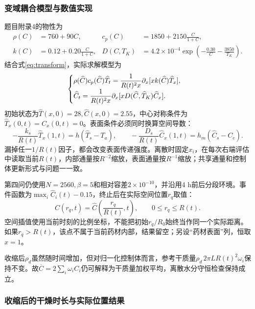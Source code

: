 \subsubsection{变域耦合模型与数值实现}
题目附录4的物性为
\begin{equation}
\begin{aligned}
\rho(C)&=760+90C,&c_p(C)&=1850+2150\frac{C}{1+C},\\
k(C)&=0.12+0.20\frac{C}{1+C},&
D(C,T_K)&=4.2\times10^{-4}
\exp\left(-\frac{0.30}{C}-\frac{3850}{T_K}\right).
\end{aligned}
\label{eq:props4}
\end{equation}
结合式\eqref{eq:transform}，实际求解模型为
\begin{equation}
\begin{cases}
\rho(\widehat C)c_p(\widehat C)\widehat T_t
=\dfrac{1}{R(t)^2x}\partial_x[xk(\widehat C)\widehat T_x],\\[5pt]
\widehat C_t
=\dfrac{1}{R(t)^2x}\partial_x[xD(\widehat C,\widehat T_K)\widehat C_x].
\end{cases}
\label{eq:q4}
\end{equation}
初始状态为$\widehat T(x,0)=28,\widehat C(x,0)=2.55$，中心对称条件为$\widehat T_x(0,t)=\widehat C_x(0,t)=0$。表面条件必须同时换算空间导数：
\begin{equation}
-\frac{k_s}{R(t)}\widehat T_x(1,t)
=h(\widehat T_s-T_a),\qquad
-\frac{D_s}{R(t)}\widehat C_x(1,t)
=h_m(\widehat C_s-C_e).
\label{eq:q4bc}
\end{equation}
漏掉任一$1/R(t)$因子，都会改变表面传递强度。离散时固定$x_i$，在每次右端评估中读取当前$R(t)$，内部通量按$R^{-2}$缩放，表面通量按$R^{-1}$缩放；共享通量和控制体更新形式与问题一一致。

第四问仍使用$N=2560,\beta=5$和相对容差$2\times10^{-10}$，并沿用4 h前后分段环境。事件函数为$\max_i\widehat C_i(t)-0.15$，终止后在实际空间位置$r_q$取值：
\begin{equation}
C(r_q,t)=\widehat C\!\left(\frac{r_q}{R(t)},t\right),
\qquad 0\le r_q\le R(t).
\end{equation}
空间插值使用当前时刻的比例坐标，不能把初始$r_q/R_0$始终当作同一个实际距离。如果$r_q>R(t)$，该点不属于当前药材内部，结果留空；另设“药材表面”列，恒取$x=1$。

收缩后$\rho_d$虽然随时间增加，但对归一化控制体而言，参考干质量$\rho_d\,2\pi LR(t)^2\omega_i$保持不变。故$\overline C=2\sum_i\omega_i C_i$仍可解释为干质量加权平均，离散水分守恒检查保持成立。

\nextpage
\subsubsection{收缩后的干燥时长与实际位置结果}


